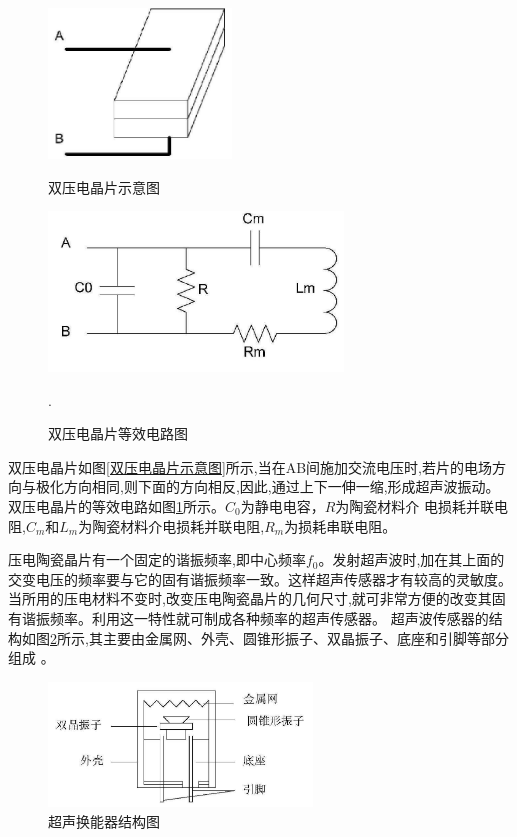     \begin{figure}[!h]

    	\begin{minipage}{0.5\textwidth}
    		\centering
    		\includegraphics[height=4cm]{figure/双压电晶片示意图.png}
    		\caption{双压电晶片示意图}
    		\label{双压电晶片示意图}
    	\end{minipage}
    \begin{minipage}{0.5\textwidth}
    	\centering
    	\includegraphics[height=4.25cm]{figure/双压电晶片等效电路.png}
    	\caption{双压电晶片等效电路图}
    	\label{双压电晶片等效电路图}.
    \end{minipage}
    	
 
    \end{figure}
    双压电晶片如图\ref{双压电晶片示意图}所示,当在AB间施加交流电压时,若片的电场方向与极化方向相同,则下面的方向相反,因此,通过上下一伸一缩,形成超声波振动。双压电晶片的等效电路如图\ref{双压电晶片等效电路图}所示。$C_0$为静电电容，$R$为陶瓷材料介 电损耗并联电阻,$C_m$和$L_m$为陶瓷材料介电损耗并联电阻,$R_m$为损耗串联电阻。\par

    压电陶瓷晶片有一个固定的谐振频率,即中心频率$f_0$。发射超声波时,加在其上面的交变电压的频率要与它的固有谐振频率一致。这样超声传感器才有较高的灵敏度。当所用的压电材料不变时,改变压电陶瓷晶片的几何尺寸,就可非常方便的改变其固有谐振频率。利用这一特性就可制成各种频率的超声传感器。
    超声波传感器的结构如图\ref{超声换能器结构图}所示,其主要由金属网、外壳、圆锥形振子、双晶振子、底座和引脚等部分组成 。
    \begin{figure}[!h]
    	\centering
    	\includegraphics[width=7cm]{figure/超声换能器结构图.png}
    	\caption{超声换能器结构图}
    	\label{超声换能器结构图}
    \end{figure}

